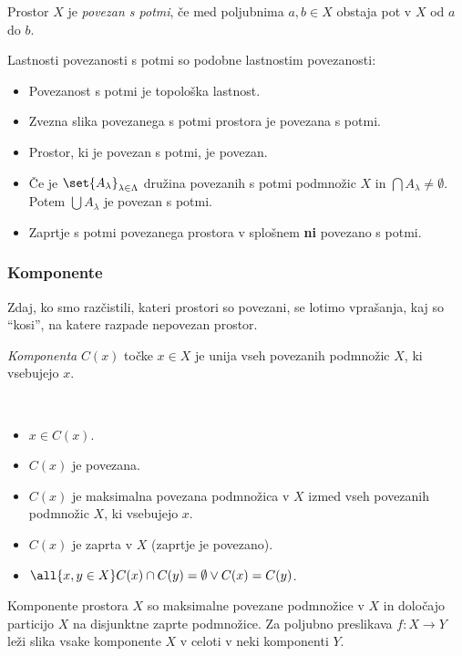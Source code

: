 \begin{definicija}
    Prostor $X$ je \emph{povezan s potmi}, če med poljubnima $a, b \in X$ obstaja pot v $X$ od $a$ do $b$.
\end{definicija}

Lastnosti povezanosti s potmi so podobne lastnostim povezanosti:
\begin{itemize}
    \item Povezanost s potmi je topološka lastnost.
    \item Zvezna slika povezanega s potmi prostora je povezana s potmi.
    \item Prostor, ki je povezan s potmi, je povezan.
    \item Če je $\set{A_\lambda}_{\lambda \in \Lambda}$ družina povezanih s potmi podmnožic $X$ in $\bigcap A_\lambda \neq \emptyset$. Potem $\bigcup A_\lambda$ je povezan s potmi.
    \item Zaprtje s potmi povezanega prostora v splošnem \textbf{ni} povezano s potmi.
\end{itemize}

\newpage
\subsubsection{Komponente}
Zdaj, ko smo razčistili, kateri prostori so povezani, se lotimo vprašanja, kaj so "`kosi"', na katere razpade nepovezan prostor.

\begin{definicija}
    \emph{Komponenta} $C(x)$ točke $x \in X$ je unija vseh povezanih podmnožic $X$, ki vsebujejo $x$.
\end{definicija}
\begin{opomba}
    \ 
    \begin{itemize}
        \item $x \in C(x)$.
        \item $C(x)$ je povezana.
        \item $C(x)$ je maksimalna povezana podmnožica v $X$ izmed vseh povezanih podmnožic $X$, ki vsebujejo $x$.
        \item $C(x)$ je zaprta v $X$ (zaprtje je povezano).
        \item $\all{x, y \in X} C(x) \cap C(y) = \emptyset \lor C(x) = C(y)$.
    \end{itemize}
\end{opomba}

\begin{izrek}
    Komponente prostora $X$ so maksimalne povezane podmnožice v $X$ in določajo particijo $X$ na disjunktne zaprte podmnožice. Za poljubno preslikava $f: X \to Y$ leži slika vsake komponente $X$ v celoti v neki komponenti $Y$.
\end{izrek}

